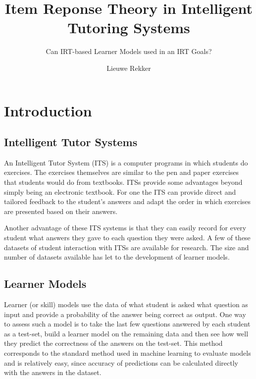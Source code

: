 \documentclass{scrartcl}
\begin{document}
 
\title{Item Reponse Theory in Intelligent Tutoring Systems}
\subtitle{Can IRT-based Learner Models used in an IRT Goals?}

\author{Lieuwe Rekker}
\maketitle
\nocite{labelcombi}
\nocite{lftransfer}
\nocite{importance}
\nocite{knowledgeproblem}
\nocite{modelreview}
\nocite{eirt}
\nocite{pfa}
\nocite{ktpfa}
\nocite{skillcombi}
\nocite{lfa}
\nocite{blackart}
\nocite{hambleton}
\nocite{newirt}
\nocite{bridge}
\nocite{ct}
\nocite{algebra}
\nocite{assessment}


\section{Introduction}


\subsection{Intelligent Tutor Systems}
An Intelligent Tutor System (ITS) is a computer programs in which students do exercises. The exercises themselves are similar to the pen and paper exercises that students would do from textbooks. ITSs provide some advantages beyond simply being an electronic textbook. For one the ITS can provide direct and tailored feedback to the student's answers and adapt the order in which exercises are presented based on their answers. 

Another advantage of these ITS systems is that they can easily record for every student what answers they gave to each question they were asked. A few of these datasets of student interaction with ITSs are available for research. The size and number of datasets available has let to the development of learner models.

\subsection{Learner Models}
Learner (or skill) models use the data of what student is asked what question as input and provide a probability of the answer being correct as output. One way to assess such a model is to take the last few questions answered by each student as a test-set, build a learner model on the remaining data and then see how well they predict the correctness of the answers on the test-set. This method corresponds to the standard method used in machine learning to evaluate models and is relatively easy, since accuracy of predictions can be calculated directly with the answers in the dataset.
\end{document}
